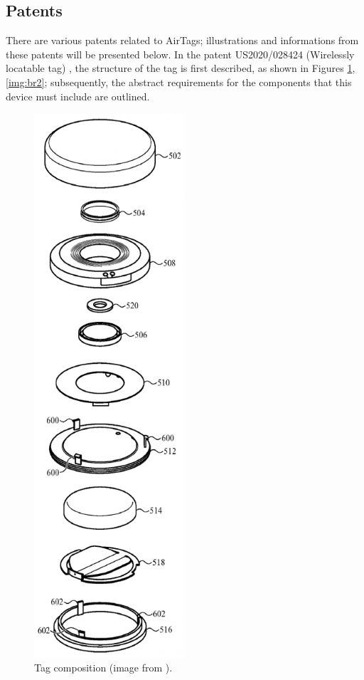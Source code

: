 \documentclass[english]{article}
\begin{document}
\subsection{Patents} %
There are various patents related to AirTags; illustrations and informations from these patents will be presented below. In the patent US2020/028424 (Wirelessly locatable tag) \cite{Perkins_Sano_Walton_Wang_Werner_Ashcroft_De_Hunter_Kim_Crosby_Jung_Schaevitz_Avendal_Da_Di_Nath_Papantonis_Graham_Thompson_Copeland_Ely_2022}, the structure of the tag is first described, as shown in Figures \ref{img:br1},\ref{img:br2}; subsequently, the abstract requirements for the components that this device must include are outlined.

\begin{figure}[]
	\centering
	\includegraphics[width=0.5\textwidth]{images/br1 struttura.png}
	\caption{Tag composition (image from \cite{Perkins_Sano_Walton_Wang_Werner_Ashcroft_De_Hunter_Kim_Crosby_Jung_Schaevitz_Avendal_Da_Di_Nath_Papantonis_Graham_Thompson_Copeland_Ely_2022}). }
	\label{img:br1}
\end{figure}
\end{document}

